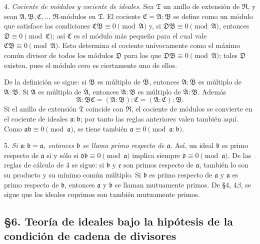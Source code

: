 \documentclass[11pt]{article}
\providecommand{\mR}{\mathfrak{R}}
\providecommand{\mT}{\mathfrak{T}}
\providecommand{\mA}{\mathfrak{A}}
\providecommand{\mB}{\mathfrak{B}}
\providecommand{\mC}{\mathfrak{C}}
\providecommand{\mD}{\mathfrak{D}}
\providecommand{\ma}{\mathfrak{a}}
\providecommand{\mb}{\mathfrak{b}}
\providecommand{\mc}{\mathfrak{c}}
\providecommand{\md}{\mathfrak{d}}
\begin{document}
4. \emph{Cociente de módulos y cociente de ideales.} Sea $\mT$ un anillo de extensión de $\mR$, y sean $\mA,\mB,\mC,\ldots$ $\mR$-módulos en $\mT$. El cociente $\mC=\mA:\mB$ se define como un módulo que satisface las condiciones $\mC\mB\equiv0\pmod{\mA}$ y, si $\mD\mB\equiv0\pmod{\mA}$, entonces $\mD\equiv0\pmod{\mC}$; así $\mC$ es el módulo más pequeño para el cual vale $\mC\mB\equiv0\pmod{\mA}$. Esto determina el cociente unívocamente como el máximo común divisor de todos los módulos $\mD$ para los que $\mD\mB\equiv0\pmod{\mA}$; tales $\mD$ existen, pues el módulo cero es ciertamente uno de ellos.

De la definición se sigue: si $\mB$ es múltiplo de $\overline{\mB}$, entonces $\mA:\overline{\mB}$ es múltiplo de $\mA:\mB$. Si $\mA$ es múltiplo de $\overline{\mA}$, entonces $\mA:\mB$ es múltiplo de $\overline{\mA}:\mB$. Además
\[
        \mA:\mB\mC=(\mA:\mB):\mC=(\mA:\mC):\mB .
\]
Si el anillo de extensión $\mT$ coincide con $\mR$, el cociente de módulos se convierte en el cociente de ideales $\ma:\mb$; por tanto las reglas anteriores valen también aquí. Como $\ma\mb\equiv0\pmod{\ma}$, se tiene también $\ma\equiv0\pmod{\ma:\mb}$.

5. \emph{Si $\ma:\mb=\ma$, entonces $\mb$ se llama primo respecto de $\ma$.} Así, un ideal $\mb$ es primo respecto de $\ma$ si y sólo si $\md\mb\equiv0\pmod{\ma}$ implica siempre $\md\equiv0\pmod{\ma}$. De las reglas de cálculo de 4 se sigue: si $\mb$ y $\mc$ son primos respecto de $\ma$, también lo son su producto y su mínimo común múltiplo. Si $\mb$ es primo respecto de $\ma$ y $\ma$ es primo respecto de $\mb$, entonces $\ma$ y $\mb$ se llaman mutuamente primos. De §4, 4$\beta$, se sigue que los ideales coprimos son también mutuamente primos.


\setcounter{footnote}{25}

\subsection*{§6. Teoría de ideales bajo la hipótesis de la condición de cadena de divisores}
\end{document}
